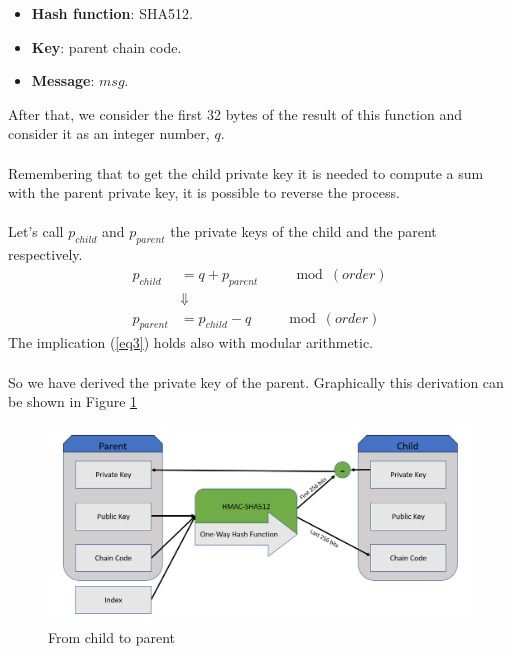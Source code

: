 \begin{itemize}[label=$\odot$]
	\item \textbf{Hash function}: SHA512.
	\item \textbf{Key}: parent chain code.
	\item \textbf{Message}: $msg$.
\end{itemize}
After that, we consider the first 32 bytes of the result of this function and consider it as an integer number, $q$.
\\ \\
Remembering that to get the child private key it is needed to compute a sum with the parent private key, it is possible to reverse the process. \\ \\
Let's call $p_{child}$ and $p_{parent}$ the private keys of the child and the parent respectively.
\begin{equation}\label{eq3}
\begin{split}
p_{child} &= q+p_{parent} \qquad \mod (order) \\
&\Downarrow \\
p_{parent} &=p_{child}-q \qquad \mod (order)
\end{split}
\end{equation}
The implication (\ref{eq3}) holds also with modular arithmetic.
\\ \\
So we have derived the private key of the parent. Graphically this derivation can be shown in Figure \ref{fig:from_child_to_parent}
\begin{figure}[ht!]
	\centering
	\includegraphics[width=14.5cm]{Figures/childtoparent.png} %
	\caption{From child to parent}
	\label{fig:from_child_to_parent}
\end{figure}



